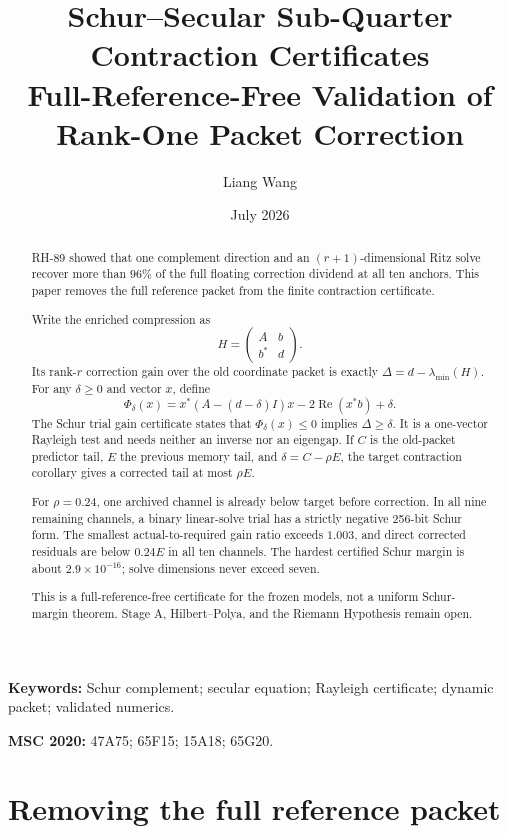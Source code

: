 \documentclass[11pt]{article}
\title{Schur--Secular Sub-Quarter Contraction Certificates\\
\large Full-Reference-Free Validation of Rank-One Packet Correction}
\author{Liang Wang}
\date{July 2026}
\theoremstyle{remark}
\begin{document}
\maketitle

\begin{abstract}
RH-89 showed that one complement direction and an $(r+1)$-dimensional Ritz
solve recover more than $96\%$ of the full floating correction dividend at
all ten anchors.  This paper removes the full reference packet from the
finite contraction certificate.

Write the enriched compression as
\[
 H=\begin{pmatrix}A&b\\b^*&d\end{pmatrix}.
\]
Its rank-$r$ correction gain over the old coordinate packet is exactly
$\Delta=d-\lambda_{\min}(H)$.  For any $\delta\ge0$ and vector $x$, define
\[
 \Phi_\delta(x)=
 x^*(A-(d-\delta)I)x-2\operatorname{Re}(x^*b)+\delta.
\]
The Schur trial gain certificate states that
$\Phi_\delta(x)\le0$ implies $\Delta\ge\delta$.  It is a one-vector Rayleigh
test and needs neither an inverse nor an eigengap.  If $C$ is the old-packet
predictor tail, $E$ the previous memory tail, and
$\delta=C-\rho E$, the target contraction corollary gives a corrected tail at
most $\rho E$.

For $\rho=0.24$, one archived channel is already below target before
correction.  In all nine remaining channels, a binary linear-solve trial has
a strictly negative 256-bit Schur form.  The smallest actual-to-required gain
ratio exceeds $1.003$, and direct corrected residuals are below $0.24E$ in all
ten channels.  The hardest certified Schur margin is about
$2.9\times10^{-16}$; solve dimensions never exceed seven.

This is a full-reference-free certificate for the frozen models, not a
uniform Schur-margin theorem.  Stage A, Hilbert--Polya, and the Riemann
Hypothesis remain open.
\end{abstract}

\noindent\textbf{Keywords:} Schur complement; secular equation; Rayleigh
certificate; dynamic packet; validated numerics.

\medskip
\noindent\textbf{MSC 2020:} 47A75; 65F15; 15A18; 65G20.

\section{Removing the full reference packet}
\end{document}
